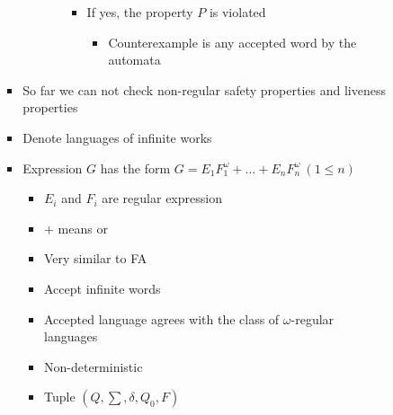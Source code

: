\begin{itemize}
\begin{itemize}
\begin{itemize}
\begin{itemize}
\begin{itemize}
\begin{itemize}
\begin{itemize}
                                                    \item If yes, the property $P$ is violated
                                                        \begin{itemize}
                                                            \item Counterexample is any accepted word by the automata
                                                        \end{itemize}
                                                \end{itemize}
                                        \end{itemize}
                                \end{itemize}
                            \item So far we can not check non-regular safety properties and liveness properties
                        \end{itemize}
                        \begin{itemize}
                            \item Denote languages of infinite works
                            \item Expression $G$ has the form $G = E_1F_1^\omega + \dots + E_nF_n^\omega \ (1 \le n)$
                                \begin{itemize}
                                    \item $E_i$ and $F_i$ are regular expression
                                    \item $+$ means or
                                \end{itemize}
                                \begin{itemize}
                                    \item Very similar to FA
                                    \item Accept infinite words
                                    \item Accepted language agrees with the class of $\omega$-regular languages
                                    \item Non-deterministic
                                    \item Tuple $(Q, \sum, \delta, Q_0, F)$
                                        \begin{itemize}

\end{itemize}
\end{itemize}
\end{itemize}
\end{itemize}
\end{itemize}
\end{itemize}

